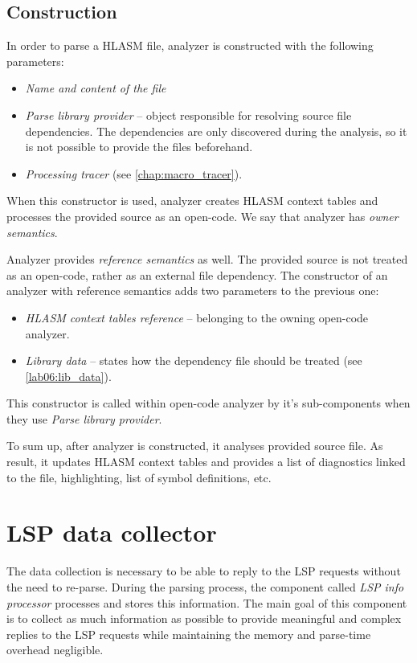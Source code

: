\subsection{Construction}

In order to parse a HLASM file, analyzer is constructed with the following parameters:
\begin{itemize}
	\item \emph{Name and content of the file}
	\item \emph{Parse library provider} -- object responsible for resolving source file dependencies. The dependencies are only discovered during the analysis, so it is not possible to provide the files beforehand.
	\item \emph{Processing tracer} (see \cref{chap:macro_tracer}).
\end{itemize}

When this constructor is used, analyzer creates HLASM context tables and processes the provided source as an open-code. We say that analyzer has \emph{owner semantics}. 
 
Analyzer provides \emph{reference semantics} as well. The provided source is not treated as an open-code, rather as an external file dependency. The constructor of an analyzer with reference semantics adds two parameters to the previous one:
\begin{itemize}
	\item \emph{HLASM context tables reference} -- belonging to the owning open-code analyzer.
	\item \emph{Library data} -- states how the dependency file should be treated (see \cref{lab06:lib_data}).
\end{itemize}

This constructor is called within open-code analyzer by it's sub-components when they use \emph{Parse library provider}.

\vspace{0.5cm}

To sum up, after analyzer is constructed, it analyses provided source file. As result, it updates HLASM context tables and provides a list of diagnostics linked to the file, highlighting, list of symbol definitions, etc.

\section{LSP data collector}

The data collection is necessary to be able to reply to the LSP requests without the need to re-parse. During the parsing process, the component called \emph{LSP info processor} processes and stores this information. The main goal of this component is to collect as much information as possible to provide meaningful and complex replies to the LSP requests while maintaining the memory and parse-time overhead negligible.

